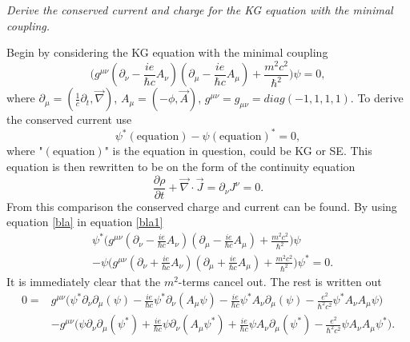 \begin{example}
	\emph{Derive the conserved current and charge for the KG equation with the minimal coupling.}\newline
	
	Begin by considering the KG equation with the minimal coupling
	\begin{equation}
		\bigg(g^{\mu\nu}(\partial_{\nu}-\frac{ie}{\hbar c}A_{\nu})(\partial_{\mu}-\frac{ie}{\hbar c}A_{\mu})+\frac{m^2c^2}{\hbar^2}\bigg)\psi=0,
		\label{bla}
	\end{equation} 
	where $\partial_\mu=(\frac{1}{c}\partial_t,\vec{\nabla})$, $A_\mu=(-\phi,\vec{A})$, $g^{\mu\nu}=g_{\mu\nu}=diag(-1,1,1,1)$. To derive the conserved current use
	\begin{equation}
		\psi^*(\mbox{equation})-\psi(\mbox{equation})^*=0,
		\label{bla1}
	\end{equation} 
	where "$(\mbox{equation})$" is the equation in question, could be KG or SE. This equation is then rewritten to be on the form of the continuity equation
	\begin{equation}
		\frac{\partial \rho}{\partial t}+\vec{\nabla}\cdot\vec{J}=\partial_\nu J^\nu=0.
		\label{continuity}
	\end{equation} 
	From this comparison the conserved charge and current can be found. By using equation \ref{bla} in equation \ref{bla1}
	\begin{equation}
		\begin{split}
			&\psi^*\bigg(g^{\mu\nu}(\partial_{\nu}-\frac{ie}{\hbar c}A_{\nu})(\partial_{\mu}-\frac{ie}{\hbar c}A_{\mu})+\frac{m^2c^2}{\hbar^2}\bigg)\psi\\
			&-\psi\bigg(g^{\mu\nu}(\partial_{\nu}+\frac{ie}{\hbar c}A_{\nu})(\partial_{\mu}+\frac{ie}{\hbar c}A_{\mu})+\frac{m^2c^2}{\hbar^2}\bigg)\psi^*=0.
		\end{split}
	\end{equation} 
	It is immediately clear that the $m^2$-terms cancel out. The rest is written out
	\begin{equation}
		\begin{split}
			0=&g^{\mu\nu}\bigg(\psi^*\partial_\nu\partial_\mu(\psi)-\frac{ie}{\hbar c}\psi^*\partial_\nu(A_\mu\psi)-\frac{ie}{\hbar c}\psi^*A_\nu\partial_\mu(\psi)-\frac{e^2}{\hbar^2c^2}\psi^*A_{\nu}A_{\mu}\psi\bigg)\\
			&-g^{\mu\nu}\bigg(\psi\partial_\nu\partial_\mu(\psi^*)+\frac{ie}{\hbar c}\psi\partial_\nu(A_\mu\psi^*)+\frac{ie}{\hbar c}\psi A_\nu\partial_\mu(\psi^*)-\frac{e^2}{\hbar^2c^2}\psi A_{\nu}A_{\mu}\psi^*\bigg).

\end{split}
\end{equation}
\end{example}
